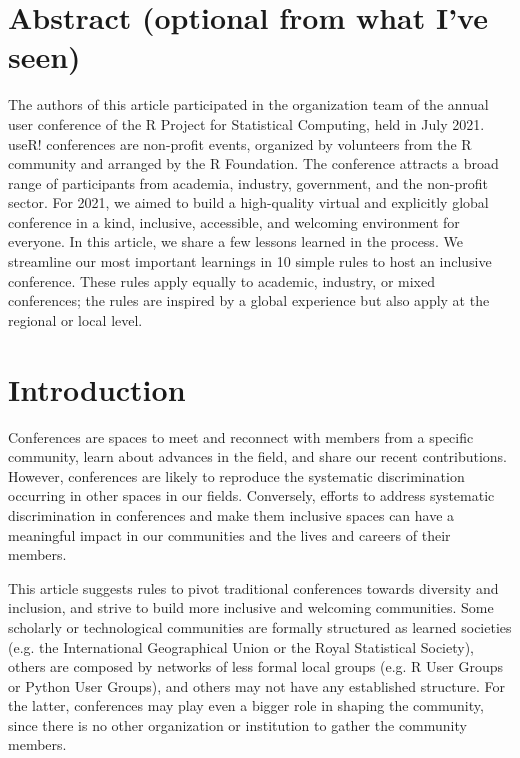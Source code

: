 \documentclass[10pt,letterpaper]{article}
\begin{document}
\section*{Abstract (optional from what I've seen)}

The authors of this article participated in the organization team of the annual user conference of the R Project for Statistical Computing, held in July 2021. useR! conferences are non-profit events, organized by volunteers from the R community and arranged by the R Foundation. The conference attracts a broad range of participants from academia, industry, government, and the non-profit sector. For 2021, we aimed to build a high-quality virtual and explicitly global conference in a kind, inclusive, accessible, and welcoming environment for everyone. 
In this article, we share a few lessons learned in the process. We streamline our most important learnings in 10 simple rules to host an inclusive conference. These rules apply equally to academic, industry, or mixed conferences; the rules are inspired by a global experience but also apply at the regional or local level.





\linenumbers

\section*{Introduction}

Conferences are spaces to meet and reconnect with members from a specific community, learn about advances in the field, and share our recent contributions. 
However, conferences are likely to reproduce the systematic discrimination occurring in other spaces in our fields. %
Conversely, efforts to address systematic discrimination in conferences and make them inclusive spaces can have a meaningful impact in our communities and the lives and careers of their members. 

This article suggests rules to pivot traditional conferences towards diversity and inclusion, and strive to build more inclusive and welcoming communities. 
Some scholarly or technological communities are formally structured as learned societies (e.g. the International Geographical Union or the Royal Statistical Society), others are composed by networks of less formal local groups (e.g. R User Groups or Python User Groups), and others may not have any established structure. 
For the latter, conferences may play even a bigger role in shaping the community, since there is no other organization or institution to gather the community members. 
\end{document}
